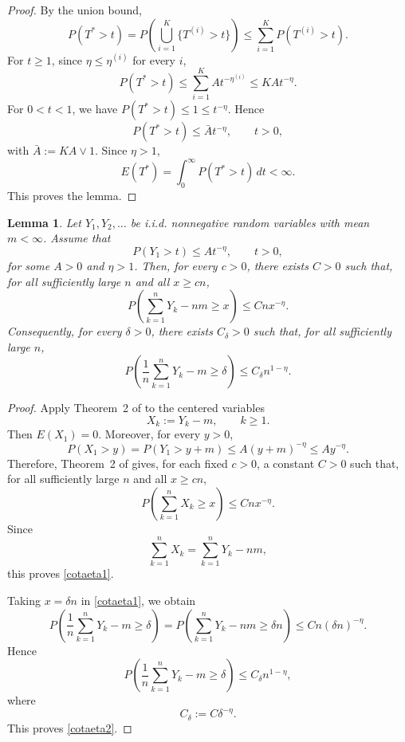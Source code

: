 \documentclass[reqno,final,11pt]{amsart}
\newcommand{\1}{\mathbbm{1}}
\renewcommand{\cite}{\citet}
\theoremstyle{plain}
\newtheorem{lemma}[theorem]{Lemma}
\theoremstyle{definition}
\theoremstyle{remark}
\begin{document}
\begin{proof}
By the union bound,
\[
P(T^*>t)
=
P\left(\bigcup_{i=1}^K\{T^{(i)}>t\}\right)
\le
\sum_{i=1}^K P(T^{(i)}>t).
\]
For \(t\ge1\), since \(\eta\le\eta^{(i)}\) for every \(i\),
\[
P(T^*>t)
\le
\sum_{i=1}^K A t^{-\eta^{(i)}}
\le
KA t^{-\eta}.
\]
For \(0<t<1\), we have \(P(T^*>t)\le1\le t^{-\eta}\). Hence
\[
P(T^*>t)\le \bar A t^{-\eta},
\qquad t>0,
\]
with \(\bar A:=KA\vee1\). Since \(\eta>1\),
\[
E(T^*)
=
\int_0^\infty P(T^*>t)\,dt
<\infty.
\]
This proves the lemma.
\end{proof}


\begin{lemma}\label{lemaaux2}
Let \(Y_1,Y_2,\dots\) be i.i.d. nonnegative random variables with mean
\(m<\infty\). Assume that
\[
P(Y_1>t)\le A t^{-\eta},
\qquad t>0,
\]
for some \(A>0\) and \(\eta>1\). Then, for every \(c>0\), there exists
\(C>0\) such that, for all sufficiently large \(n\) and all \(x\ge cn\),
\begin{equation}\label{cotaeta1}
P\left(\sum_{k=1}^nY_k-nm\ge x\right)
\le C n x^{-\eta}.
\end{equation}
Consequently, for every \(\delta>0\), there exists \(C_\delta>0\) such that,
for all sufficiently large \(n\),
\begin{equation}\label{cotaeta2}
P\left(\frac1n\sum_{k=1}^nY_k-m\ge\delta\right)
\le C_\delta n^{1-\eta}.
\end{equation}
\end{lemma}

\begin{proof}
Apply Theorem~2 of \cite{Naga} to the centered variables
\[
X_k:=Y_k-m,
\qquad k\ge1.
\]
Then \(E(X_1)=0\). Moreover, for every \(y>0\),
\[
P(X_1>y)
=
P(Y_1>y+m)
\le
A(y+m)^{-\eta}
\le
A y^{-\eta}.
\]
Therefore, Theorem~2 of \cite{Naga} gives, for each fixed \(c>0\), a constant
\(C>0\) such that, for all sufficiently large \(n\) and all \(x\ge cn\),
\[
P\left(\sum_{k=1}^nX_k\ge x\right)
\le
C n x^{-\eta}.
\]
Since
\[
\sum_{k=1}^nX_k
=
\sum_{k=1}^nY_k-nm,
\]
this proves \eqref{cotaeta1}.

Taking \(x=\delta n\) in \eqref{cotaeta1}, we obtain
\[
P\left(
\frac1n\sum_{k=1}^nY_k-m\ge\delta
\right)
=
P\left(
\sum_{k=1}^nY_k-nm\ge \delta n
\right)
\le
C n(\delta n)^{-\eta}.
\]
Hence
\[
P\left(
\frac1n\sum_{k=1}^nY_k-m\ge\delta
\right)
\le
C_\delta n^{1-\eta},
\]
where
\[
C_\delta:=C\delta^{-\eta}.
\]
This proves \eqref{cotaeta2}.
\end{proof}
\end{document}
